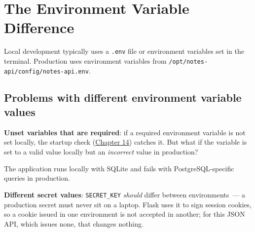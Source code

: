 \section{The Environment Variable Difference}\label{39-local-vs-production:393-the-environment-variable-difference}

Local development typically uses a \texttt{.env} file or environment variables set in the terminal. Production uses environment variables from \texttt{/}\allowbreak{}\texttt{opt/}\allowbreak{}\texttt{notes-}\allowbreak{}\texttt{api/}\allowbreak{}\texttt{config/}\allowbreak{}\texttt{notes-}\allowbreak{}\texttt{api.}\allowbreak{}\texttt{env}.

\subsection*{Problems with different environment variable values}\label{39-local-vs-production:problems-with-different-environment-variable-values}

\textbf{Unset variables that are required}: if a required environment variable is not set locally, the startup check (\hyperref[ch:14-runtime-contract]{Chapter 14}) catches it. But what if the variable is set to a valid value locally but an \emph{incorrect} value in production?

\begin{codebox}[short]

\begin{Shaded}
\begin{Highlighting}[]
\OperatorTok{=}

\OperatorTok{=}
\end{Highlighting}
\end{Shaded}

\end{codebox}

\noindent{}The application runs locally with SQLite and fails with PostgreSQL-specific queries in production.

\textbf{Different secret values}: \texttt{SECRET\_KEY} \emph{should} differ between environments~--- a production secret must never sit on a laptop. Flask uses it to sign session cookies, so a cookie issued in one environment is not accepted in another; for this JSON API, which issues none, that changes nothing.

